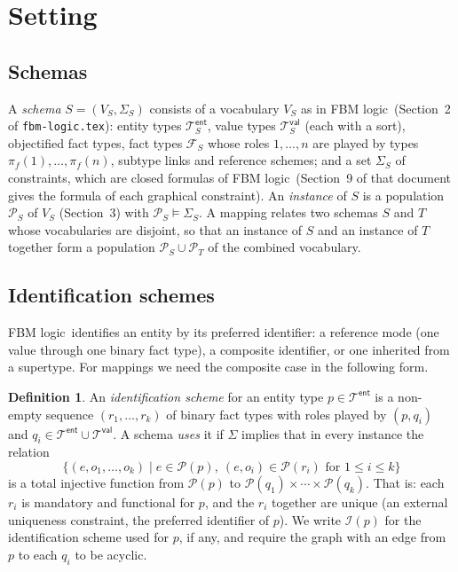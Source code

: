 \documentclass[11pt]{amsart}
\theoremstyle{definition}
\newtheorem{definition}{Definition}
\theoremstyle{remark}
\newcommand{\FBM}{FBM logic}
\newcommand{\Types}{\mathcal{T}}
\newcommand{\EntTypes}{\Types^{\mathsf{ent}}}
\newcommand{\ValTypes}{\Types^{\mathsf{val}}}
\newcommand{\FactTypes}{\mathcal{F}}
\newcommand{\pop}{\mathcal{P}}
\newcommand{\IdSchemes}{\mathcal{I}}
\begin{document}
\section{Setting}
\label{sec:setting}

\subsection{Schemas}

A \emph{schema} $S = (V_S, \Sigma_S)$ consists of a vocabulary $V_S$ as in
\FBM\ (Section~2 of \texttt{fbm-logic.tex}): entity types $\EntTypes_S$,
value types $\ValTypes_S$ (each with a sort), objectified fact types, fact
types $\FactTypes_S$ whose roles $1,\ldots,n$ are played by types
$\pi_f(1),\ldots,\pi_f(n)$, subtype links and reference schemes; and a set
$\Sigma_S$ of constraints, which are closed formulas of \FBM\ (Section~9 of
that document gives the formula of each graphical constraint). An
\emph{instance} of $S$ is a population $\pop_S$ of $V_S$ (Section~3) with
$\pop_S \models \Sigma_S$. A mapping relates two schemas $S$ and $T$ whose
vocabularies are disjoint, so that an instance of $S$ and an instance of
$T$ together form a population $\pop_S \cup \pop_T$ of the combined
vocabulary.

\subsection{Identification schemes}

\FBM\ identifies an entity by its preferred identifier: a reference mode
(one value through one binary fact type), a composite identifier, or one
inherited from a supertype. For mappings we need the composite case in the
following form.

\begin{definition}
An \emph{identification scheme} for an entity type $p \in \EntTypes$ is a
non-empty sequence $(r_1, \ldots, r_k)$ of binary fact types with roles
played by $(p, q_i)$ and $q_i \in \EntTypes \cup \ValTypes$. A schema
\emph{uses} it if $\Sigma$ implies that in every instance the relation
$$\{ (e, o_1, \ldots, o_k) \mid e \in \pop(p),\ (e, o_i) \in \pop(r_i)
  \text{ for } 1 \le i \le k \}$$
is a total injective function from $\pop(p)$ to $\pop(q_1) \times \cdots
\times \pop(q_k)$. That is: each $r_i$ is mandatory and functional for
$p$, and the $r_i$ together are unique (an external uniqueness constraint,
the preferred identifier of $p$). We write $\IdSchemes(p)$ for the
identification scheme used for $p$, if any, and require the graph with an
edge from $p$ to each $q_i$ to be acyclic.
\end{definition}
\end{document}
